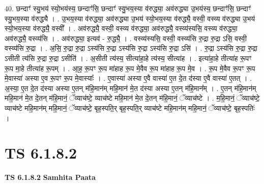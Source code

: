 \documentclass[17pt]{extarticle}
\begin{document}
40. छन्दाꣳ॑ स्यु॒भय॑ स्यो॒भय॑स्य॒ छन्दाꣳ॑सि॒ छन्दाꣳ॑ स्यु॒भय॒स्या व॑रुद्ध्या॒ अव॑रुद्ध्या उ॒भय॑स्य॒ छन्दाꣳ॑सि॒ छन्दाꣳ॑ स्यु॒भय॒स्या व॑रुद्ध्यै । . उ॒भय॒स्या व॑रुद्ध्या॒ अव॑रुद्ध्या उ॒भय॑ स्यो॒भय॒स्या व॑रुद्ध्यै॒ वस्वी॒ वस्व्य व॑रुद्ध्या उ॒भय॑
स्यो॒भय॒स्या व॑रुद्ध्यै॒ वस्वी᳚ । . अव॑रुद्ध्यै॒ वस्वी॒ वस्व्य व॑रुद्ध्या॒ अव॑रुद्ध्यै॒ वस्व्य॑स्यसि॒ वस्व्य व॑रुद्ध्या॒ अव॑रुद्ध्यै॒ वस्व्य॑सि । . अव॑रुद्ध्या॒ इत्यव॑ - रु॒द्ध्यै॒ । . वस्व्य॑स्यसि॒ वस्वी॒ वस्व्य॑सि रु॒द्रा रु॒द्रा ऽसि॒ वस्वी॒ वस्व्य॑सि रु॒द्रा । . अ॒सि॒ रु॒द्रा रु॒द्रा ऽस्य॑सि रु॒द्रा ऽस्य॑सि रु॒द्रा ऽस्य॑सि रु॒द्रा ऽसि॑ । . रु॒द्रा ऽस्य॑सि रु॒द्रा रु॒द्रा ऽसीती त्य॑सि रु॒द्रा रु॒द्रा ऽसीति॑ । . अ॒सीती त्य॑स्य॒ सीत्या॑हा॒हे त्य॑स्य॒ सीत्या॑ह । . इत्या॑हा॒हे तीत्या॑ह रू॒पꣳ रू॒प मा॒हे तीत्या॑ह रू॒पम् । . आ॒ह॒ रू॒पꣳ रू॒प मा॑हाह रू॒प मे॒वैव रू॒प मा॑हाह रू॒प मे॒व । . रू॒प मे॒वैव रू॒पꣳ रू॒प मे॒वास्या॑ अस्या ए॒व रू॒पꣳ रू॒प मे॒वास्याः᳚ । . ए॒वास्या॑ अस्या ए॒वै वास्या॑ ए॒त दे॒त द॑स्या ए॒वै वास्या॑ ए॒तत् । . अ॒स्या॒ ए॒त दे॒त द॑स्या अस्या ए॒तन् म॑हि॒मान॑म् महि॒मान॑ मे॒त द॑स्या अस्या ए॒तन् म॑हि॒मान᳚म् । . ए॒तन् म॑हि॒मान॑म् महि॒मान॑ मे॒त दे॒तन् म॑हि॒मानं॒ ॅव्याच॑ष्टे॒ व्याच॑ष्टे महि॒मान॑ मे॒त दे॒तन् म॑हि॒मानं॒ ॅव्याच॑ष्टे । . म॒हि॒मानं॒ ॅव्याच॑ष्टे॒ व्याच॑ष्टे महि॒मान॑म् महि॒मानं॒ ॅव्याच॑ष्टे॒ बृह॒स्पति॒र् बृह॒स्पति॒र् व्याच॑ष्टे महि॒मान॑म् महि॒मानं॒ ॅव्याच॑ष्टे॒ बृह॒स्पतिः॑ । \newline
\pagebreak
{}

\section{ TS 6.1.8.2 }

\textbf{TS 6.1.8.2 } \newline
\textbf{Samhita Paata} \newline
\end{document}
